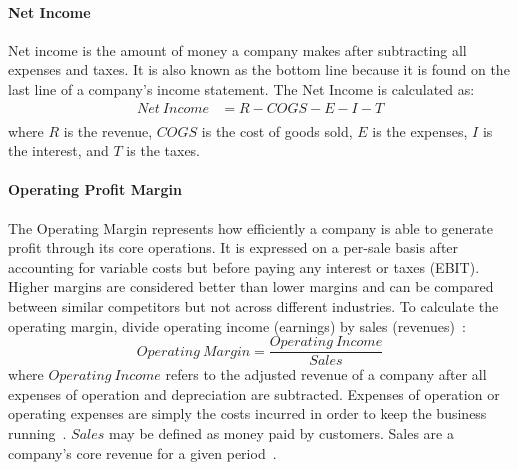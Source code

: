 \documentclass[../xlapes02]{subfiles}
\begin{document}
    \paragraph{Net Income}\label{par:net-income}
    Net income is the amount of money a company makes after subtracting all expenses and taxes. It is also known as the bottom line because it is found on the last line of a company's income statement. The Net Income is calculated as:
    \begin{equation}
        \begin{split}
            Net\ Income&=R-COGS-E-I-T\\
        \end{split}
    \end{equation}
    where $R$ is the revenue, $COGS$ is the cost of goods sold, $E$ is the expenses, $I$ is the interest, and $T$ is the taxes.

    \paragraph{Operating Profit Margin}\label{par:operating-profit-margin}
    The Operating Margin represents how efficiently a company is able to generate profit through its core operations. It is expressed on a per-sale basis after accounting for variable costs but before paying any interest or taxes (EBIT). Higher margins are considered better than lower margins and can be compared between similar competitors but not across different industries. To calculate the operating margin, divide operating income (earnings) by sales (revenues)~\cite{investopedia-operating-margin}:
    \begin{equation}
        Operating\ Margin=\frac{Operating\ Income}{Sales}
    \end{equation}
    where $Operating\ Income$ refers to the adjusted revenue of a company after all expenses of operation and depreciation are subtracted. Expenses of operation or operating expenses are simply the costs incurred in order to keep the business running~\cite{investopedia-operating-income}. $Sales$ may be defined as money paid by customers. Sales are a company's core revenue for a given period~\cite{investopedia-operating-margin}.
\end{document}
